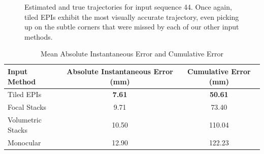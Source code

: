 \begin{figure}[H]
{    }
    \caption[Estimated and true trajectories for input sequence 44 using light field reconstruction]{Estimated and true trajectories for input sequence 44. Once again, tiled EPIs exhibit the most visually accurate trajectory, even picking up on the subtle corners that were missed by each of our other input methods.}
    \setcounter{subfigure}{0}
\end{figure}

\begin{table}[htbp]
    \caption{Mean Absolute Instantaneous Error and Cumulative Error}
    \centering
    \begin{tabular}{@{}lcc@{}}
        \toprule
        Input Method        & Absolute Instantaneous Error (mm)  & Cumulative Error (mm)  \\
        \midrule 
        Tiled EPIs & \textbf{7.61} & \textbf{50.61} \\
        Focal Stacks & 9.71 & 73.40 \\
        Volumetric Stacks & 10.50 & 110.04 \\
        Monocular & 12.90 & 122.23 \\
        \bottomrule
        
    \end{tabular}
\end{table}









